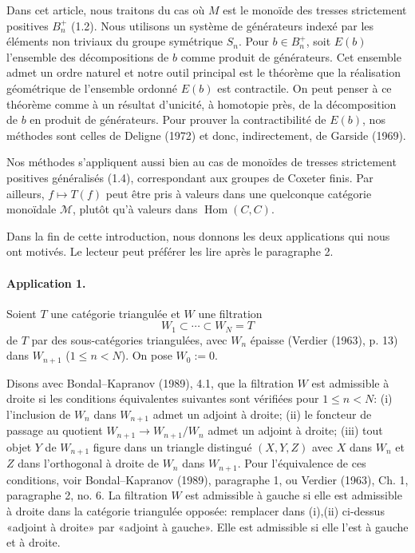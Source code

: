 \documentclass[11pt]{article}
\newcommand{\Hom}{\operatorname{Hom}}
\newcommand{\calM}{\mathcal M}
\begin{document}
Dans cet article, nous traitons du cas où $M$ est le monoïde des tresses strictement positives $B_n^+$ (1.2). Nous utilisons un système de générateurs indexé par les éléments non triviaux du groupe symétrique $S_n$. Pour $b\in B_n^+$, soit $E(b)$ l'ensemble des décompositions de $b$ comme produit de générateurs. Cet ensemble admet un ordre naturel et notre outil principal est le théorème que la réalisation géométrique de l'ensemble ordonné $E(b)$ est contractile. On peut penser à ce théorème comme à un résultat d'unicité, à homotopie près, de la décomposition de $b$ en produit de générateurs. Pour prouver la contractibilité de $E(b)$, nos méthodes sont celles de Deligne (1972) et donc, indirectement, de Garside (1969).

Nos méthodes s'appliquent aussi bien au cas de monoïdes de tresses strictement positives généralisés (1.4), correspondant aux groupes de Coxeter finis. Par ailleurs, $f\mapsto T(f)$ peut être pris à valeurs dans une quelconque catégorie monoïdale $\calM$, plutôt qu'à valeurs dans $\Hom(C,C)$.

Dans la fin de cette introduction, nous donnons les deux applications qui nous ont motivés. Le lecteur peut préférer les lire après le paragraphe 2.

\paragraph{Application 1.} Soient $T$ une catégorie triangulée et $W$ une filtration
\[
 W_1\subset\cdots\subset W_N=T
\]
de $T$ par des sous-catégories triangulées, avec $W_n$ épaisse (Verdier (1963), p. 13) dans $W_{n+1}$ ($1\leq n<N$). On pose $W_0:=0$.

Disons avec Bondal--Kapranov (1989), 4.1, que la filtration $W$ est admissible à droite si les conditions équivalentes suivantes sont vérifiées pour $1\leq n<N$: (i) l'inclusion de $W_n$ dans $W_{n+1}$ admet un adjoint à droite; (ii) le foncteur de passage au quotient $W_{n+1}\to W_{n+1}/W_n$ admet un adjoint à droite; (iii) tout objet $Y$ de $W_{n+1}$ figure dans un triangle distingué $(X,Y,Z)$ avec $X$ dans $W_n$ et $Z$ dans l'orthogonal à droite de $W_n$ dans $W_{n+1}$. Pour l'équivalence de ces conditions, voir Bondal--Kapranov (1989), paragraphe 1, ou Verdier (1963), Ch. 1, paragraphe 2, no. 6. La filtration $W$ est admissible à gauche si elle est admissible à droite dans la catégorie triangulée opposée: remplacer dans (i),(ii) ci-dessus «adjoint à droite» par «adjoint à gauche». Elle est admissible si elle l'est à gauche et à droite.
\end{document}
